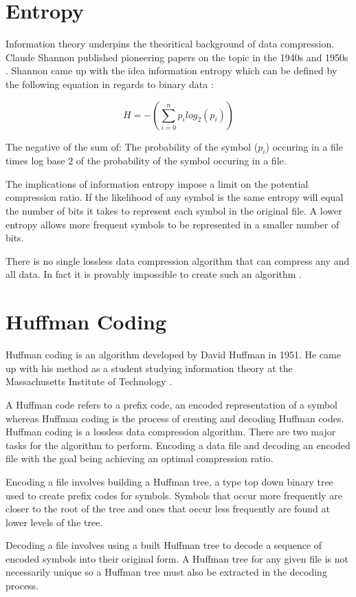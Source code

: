 \doublespacing
\singlespacing
\section{Entropy}


\singlespacing


Information theory underpins the theoritical background of data compression. Claude Shannon published pioneering  papers on the topic in the 1940s and 1950s \cite{WikiDataCompression}. Shannon came up with the idea information entropy which can be defined by the following equation in regards to binary data \cite{MasseyStudyGuide}:


\begin{equation*}
  H = -\left(\sum\limits_{i=0}^n p_{i} log_{2}(p_{i})\right)
\end{equation*}


\doublespacing
\singlespacing
The negative of the sum of: The probability of the symbol ($p_{i}$) occuring in a file times log base 2 of the probability of the symbol occuring in a file.


\doublespacing
\singlespacing
The implications of information entropy impose a limit on the potential compression ratio. If the likelihood of any symbol is the same entropy will equal the number of bits it takes to represent each symbol in the original file. A lower entropy allows more frequent symbols to be represented in a smaller number of bits.


\doublespacing
\singlespacing
There is no single lossless data compression algorithm that can compress any and all data. In fact it is provably impossible to create such an algorithm \cite{WikiLossless}.


\section{Huffman Coding}


\doublespacing
\singlespacing
Huffman coding is an algorithm developed by David Huffman in 1951. He came up with his method as a student studying information theory at the Massachusetts Institute of Technology \cite{WikiHuffman}.


\doublespacing
\singlespacing
A Huffman code refers to a prefix code, an encoded representation of a symbol whereas Huffman coding is the process of creating and decoding Huffman codes. Huffman coding is a lossless data compression algorithm. There are two major tasks for the algorithm to perform. Encoding a data file and decoding an encoded file with the goal being achieving an optimal compression ratio.


\doublespacing
\singlespacing
Encoding a file involves building a Huffman tree, a type top down binary tree used to create prefix codes for symbols. Symbols that occur more frequently are closer to the root of the tree and ones that occur less frequently are found at lower levels of the tree.


\doublespacing
\singlespacing
Decoding a file involves using a built Huffman tree to decode a sequence of encoded symbols into their original form. A Huffman tree for any given file is not necessarily unique so a Huffman tree must also be extracted in the decoding process.